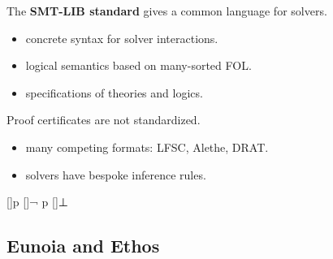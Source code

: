 \documentclass[handout, t, lualatex, compress, 11pt]{beamer}
\begin{document}
\begin{frame}{\secheader}%
	The \textbf{SMT-LIB standard} gives a common language for solvers.
	\begin{itemize}
		\item<+-> concrete syntax for solver interactions.
		\item<+-> logical semantics based on many-sorted FOL.
		\item<+-> specifications of theories and logics.
	\end{itemize}
	\vfill
	\noindent{}
\end{frame}


\begin{frame}{\secheader}%
	Proof certificates are not standardized.
	\begin{itemize}
		\item<+-> many competing formats: LFSC, Alethe, DRAT.
		\item<+-> solvers have bespoke inference rules.
	\end{itemize}
	\vfill
	\begin{center}
		\begin{prooftree}
			[]{p}
			[]{¬ p}
			[]{⊥}
		\end{prooftree}
	\end{center}
	\vspace{\gapunit}
\end{frame}


\subsection{Eunoia and Ethos}
\end{document}
